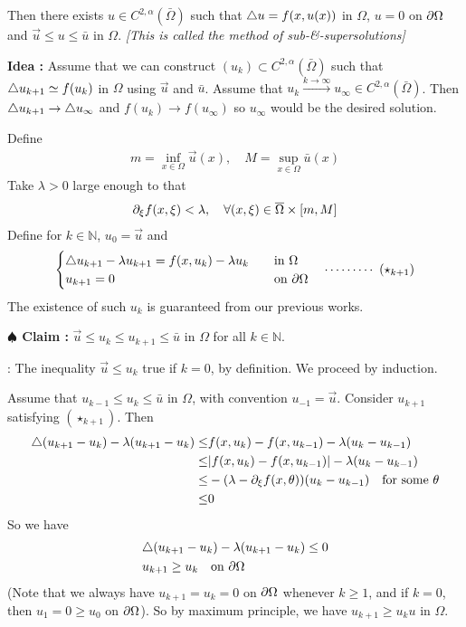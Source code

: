 \documentclass[12pt,a4paper]{article}
\newenvironment{proof}
{\begin{changemargin}{0.5cm}{0.5cm} 
	}%
	{\end{changemargin}
}
\newenvironment{subproof}
{\begin{changemargin}{0.5cm}{0.5cm} 
	}%
	{\end{changemargin}
}
\newenvironment{p}
{\begin{proof} 
	}%
	{\end{proof}
}
\begin{document}
Then there exists $u\in C^{2, \alpha}(\bar{\Omega})$ such that $\triangle u = f(x,u(x))$ in $\Omega$, $u=0$ on $\partial \Omega$ and $\vec{u}\leq u\leq \bar{u}$ in $\Omega$.
\emph{[This is called the method of sub-\&-supersolutions]}
\begin{p}
\textbf{Idea :} Assume that we can construct $(u_k)\subset C^{2, \alpha}(\bar{\Omega})$ such that $\triangle u_{k+1} \simeq f(u_k)$ in $\Omega$ using $\vec{u}$ and $\bar{u}$. Assume that $u_k \xrightarrow{k\rightarrow \infty} u_{\infty} \in C^{2, \alpha}(\bar{\Omega})$. Then $\triangle u_{k+1} \rightarrow \triangle u_{\infty}$ and $f(u_k) \rightarrow f(u_{\infty})$ so $u_{\infty}$ would be the desired solution.
\s

\pf Define
\begin{align*}
m= \inf_{x\in \Omega} \vec{u}(x), \quad M = \sup_{x\in \Omega} \bar{u}(x)
\end{align*}
Take $\lambda >0$ large enough to that
\begin{align*}
\partial_{\xi} f(x,\xi) < \lambda, \quad \forall (x, \xi) \in \overline{\Omega} \times [m, M]
\end{align*}
Define for $k\in \mathbb{N}$, $u_0 = \vec{u}$ and
\begin{align*}
\begin{cases}
\triangle u_{k+1} - \lambda u_{k+1} = f(x, u_k) - \lambda u_k \quad & \text{in }\Omega \\
u_{k+1} =0 \quad & \text{on } \partial\Omega
\end{cases} \quad \cdots\cdots\cdots\,\,(\star_{k+1})
\end{align*}
The existence of such $u_k$ is guaranteed from our previous works.

\textbf{$\spadesuit$ Claim :} $\vec{u} \leq u_k \leq u_{k+1} \leq \bar{u}$ in $\Omega$ for all $k \in \mathbb{N}$.
\begin{subproof}
: The inequality $\vec{u} \leq u_k$ true if $k=0$, by definition. We proceed by induction.

\quad Assume that $u_{k-1} \leq u_k \leq \bar{u}$ in $\Omega$, with convention $u_{-1} = \vec{u}$. Consider $u_{k+1}$ satisfying $(\star_{k+1})$. Then
\begin{align*}
\triangle (u_{k+1} - u_k) - \lambda(u_{k+1}- u_k) \leq & f(x, u_k) - f(x, u_{k-1}) - \lambda(u_k - u_{k-1}) \\
\leq & |f(x, u_k) - f(x, u_{k-1})| - \lambda(u_k- u_{k-1}) \\
\leq & -(\lambda - \partial_{\xi} f(x, \theta)) (u_k - u_{k-1}) \quad \text{for some }\theta \\
\leq & 0
\end{align*}
So we have
\begin{align*}
& \triangle(u_{k+1} - u_{k}) - \lambda(u_{k+1}- u_{k}) \leq 0 \\
& u_{k+1} \geq u_k  \quad \text{on } \partial \Omega
\end{align*}
(Note that we always have $u_{k+1} = u_k =0$ on $\partial \Omega$ whenever $k\geq 1$, and if $k=0$, then $u_1 =0 \geq u_0$ on $\partial \Omega$). So by maximum principle, we have $u_{k+1} \geq u_k{u}$ in $\Omega$.


\end{subproof}
\end{p}
\end{document}
